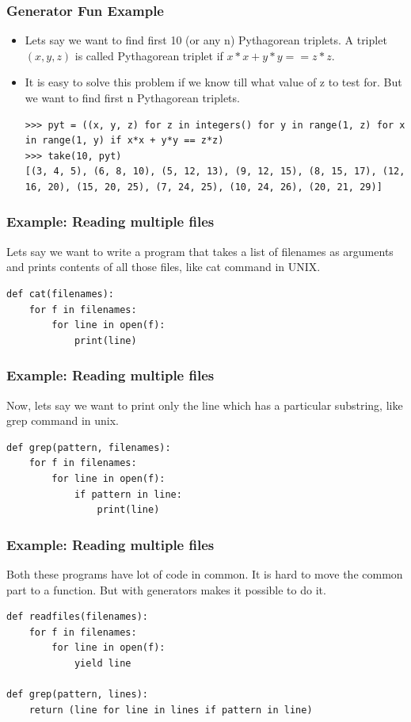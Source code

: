 \begin{frame}[fragile]\frametitle{Generator Fun Example}

    \begin{itemize}
    \item  Lets say we want to find first 10 (or any n) Pythagorean triplets. A triplet $(x, y, z)$ is called Pythagorean triplet if $x*x + y*y == z*z$.
\item It is easy to solve this problem if we know till what value of z to test for. But we want to find first n Pythagorean triplets.
\begin{lstlisting}
>>> pyt = ((x, y, z) for z in integers() for y in range(1, z) for x in range(1, y) if x*x + y*y == z*z)
>>> take(10, pyt)
[(3, 4, 5), (6, 8, 10), (5, 12, 13), (9, 12, 15), (8, 15, 17), (12, 16, 20), (15, 20, 25), (7, 24, 25), (10, 24, 26), (20, 21, 29)]
\end{lstlisting}
    \end{itemize}
\end{frame}

\begin{frame}[fragile]\frametitle{Example: Reading multiple files}
Lets say we want to write a program that takes a list of filenames as arguments and prints contents of all those files, like cat command in UNIX.
\begin{lstlisting}
def cat(filenames):
    for f in filenames:
        for line in open(f):
            print(line)
\end{lstlisting}

\end{frame}

\begin{frame}[fragile]\frametitle{Example: Reading multiple files}
Now, lets say we want to print only the line which has a particular substring, like grep command in unix.
\begin{lstlisting}
def grep(pattern, filenames):
    for f in filenames:
        for line in open(f):
            if pattern in line:
                print(line)
\end{lstlisting}

\end{frame}

\begin{frame}[fragile]\frametitle{Example: Reading multiple files}
Both these programs have lot of code in common. It is hard to move the common part to a function. But with generators makes it possible to do it.
\begin{lstlisting}
def readfiles(filenames):
    for f in filenames:
        for line in open(f):
            yield line

def grep(pattern, lines):
    return (line for line in lines if pattern in line)
\end{lstlisting}

\end{frame}

